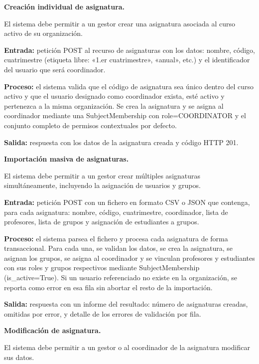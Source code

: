 \begin{functional}
  \begin{functional}
    \item \textbf{Creación individual de asignatura.}

    El sistema debe permitir a un gestor crear una asignatura asociada al curso activo de su organización.

    \textbf{Entrada:} petición POST al recurso de asignaturas con los datos: nombre, código, cuatrimestre (etiqueta libre: «1.er cuatrimestre», «anual», etc.) y el identificador del usuario que será coordinador.

    \textbf{Proceso:} el sistema valida que el código de asignatura sea único dentro del curso activo y que el usuario designado como coordinador exista, esté activo y pertenezca a la misma organización. Se crea la asignatura y se asigna al coordinador mediante una SubjectMembership con role=COORDINATOR y el conjunto completo de permisos contextuales por defecto.

    \textbf{Salida:} respuesta con los datos de la asignatura creada y código HTTP 201.

    \item \textbf{Importación masiva de asignaturas.}

    El sistema debe permitir a un gestor crear múltiples asignaturas simultáneamente, incluyendo la asignación de usuarios y grupos.

    \textbf{Entrada:} petición POST con un fichero en formato CSV o JSON que contenga, para cada asignatura: nombre, código, cuatrimestre, coordinador, lista de profesores, lista de grupos y asignación de estudiantes a grupos.

    \textbf{Proceso:} el sistema parsea el fichero y procesa cada asignatura de forma transaccional. Para cada una, se validan los datos, se crea la asignatura, se asignan los grupos, se asigna al coordinador y se vinculan profesores y estudiantes con sus roles y grupos respectivos mediante SubjectMembership (is\_active=True). Si un usuario referenciado no existe en la organización, se reporta como error en esa fila sin abortar el resto de la importación.

    \textbf{Salida:} respuesta con un informe del resultado: número de asignaturas creadas, omitidas por error, y detalle de los errores de validación por fila.

    \item \textbf{Modificación de asignatura.}

    El sistema debe permitir a un gestor o al coordinador de la asignatura modificar sus datos.


\end{functional}
\end{functional}
